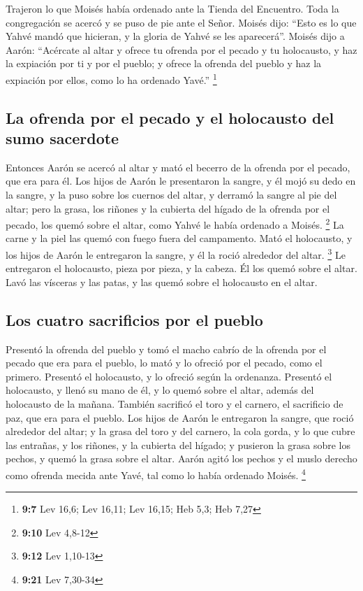  Trajeron lo que Moisés había ordenado ante la Tienda del
Encuentro. Toda la congregación se acercó y se puso de pie ante el
Señor.  Moisés dijo: ``Esto es lo que Yahvé mandó que
hicieran, y la gloria de Yahvé se les aparecerá''.  Moisés
dijo a Aarón: ``Acércate al altar y ofrece tu ofrenda por el pecado y tu
holocausto, y haz la expiación por ti y por el pueblo; y ofrece la
ofrenda del pueblo y haz la expiación por ellos, como lo ha ordenado
Yavé.'' \footnote{\textbf{9:7} Lev 16,6; Lev 16,11; Lev 16,15; Heb 5,3;
  Heb 7,27}

\hypertarget{la-ofrenda-por-el-pecado-y-el-holocausto-del-sumo-sacerdote}{%
\subsection{La ofrenda por el pecado y el holocausto del sumo
sacerdote}\label{la-ofrenda-por-el-pecado-y-el-holocausto-del-sumo-sacerdote}}

 Entonces Aarón se acercó al altar y mató el becerro de la
ofrenda por el pecado, que era para él.  Los hijos de
Aarón le presentaron la sangre, y él mojó su dedo en la sangre, y la
puso sobre los cuernos del altar, y derramó la sangre al pie del altar;
 pero la grasa, los riñones y la cubierta del hígado de
la ofrenda por el pecado, los quemó sobre el altar, como Yahvé le había
ordenado a Moisés. \footnote{\textbf{9:10} Lev 4,8-12} 
La carne y la piel las quemó con fuego fuera del campamento.
 Mató el holocausto, y los hijos de Aarón le entregaron
la sangre, y él la roció alrededor del altar. \footnote{\textbf{9:12}
  Lev 1,10-13}  Le entregaron el holocausto, pieza por
pieza, y la cabeza. Él los quemó sobre el altar.  Lavó
las vísceras y las patas, y las quemó sobre el holocausto en el altar.

\hypertarget{los-cuatro-sacrificios-por-el-pueblo}{%
\subsection{Los cuatro sacrificios por el
pueblo}\label{los-cuatro-sacrificios-por-el-pueblo}}

 Presentó la ofrenda del pueblo y tomó el macho cabrío de
la ofrenda por el pecado que era para el pueblo, lo mató y lo ofreció
por el pecado, como el primero.  Presentó el holocausto,
y lo ofreció según la ordenanza.  Presentó el holocausto,
y llenó su mano de él, y lo quemó sobre el altar, además del holocausto
de la mañana.  También sacrificó el toro y el carnero, el
sacrificio de paz, que era para el pueblo. Los hijos de Aarón le
entregaron la sangre, que roció alrededor del altar;  y
la grasa del toro y del carnero, la cola gorda, y lo que cubre las
entrañas, y los riñones, y la cubierta del hígado;  y
pusieron la grasa sobre los pechos, y quemó la grasa sobre el altar.
 Aarón agitó los pechos y el muslo derecho como ofrenda
mecida ante Yavé, tal como lo había ordenado Moisés. \footnote{\textbf{9:21}
  Lev 7,30-34}

